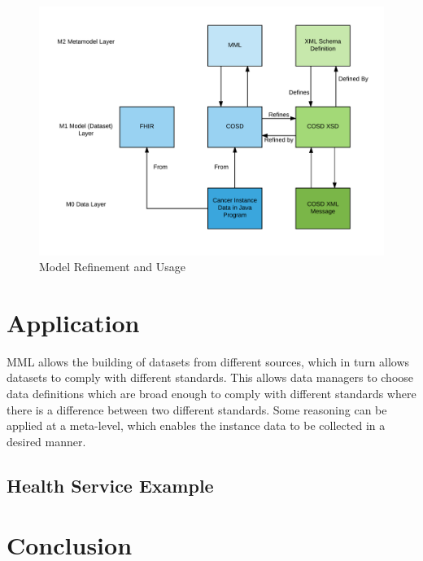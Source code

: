 \documentclass{llncs}
\begin{document}
	\begin{figure}
		\centering
		\includegraphics[scale=0.62]{figures/DatasetRefinement}
		\caption{Model Refinement and Usage}
		\label{fig:mmrefine}
	\end{figure}
	
	
	\section{Application}
	MML allows the building of datasets from different sources, which in turn allows datasets to comply with different standards. This allows data managers to choose data definitions which are broad enough to comply with different standards where there is a difference between two different standards. Some reasoning can be applied at a meta-level, which enables the instance data to be collected in a desired manner.
	
	
	
	
	\subsection{Health Service Example}
 
	
	
	\section{Conclusion}
	
	
	
	
	
	
\end{document}
